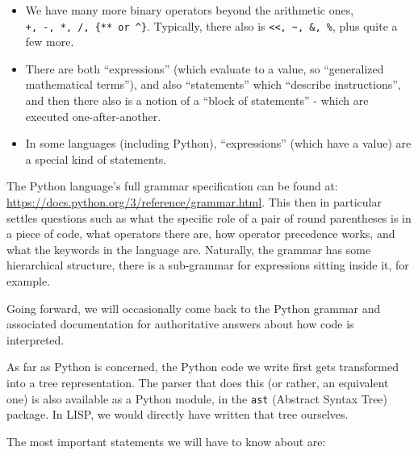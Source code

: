 \documentclass[11pt]{article}
\providecommand{\tightlist}{%
      \setlength{\itemsep}{0pt}\setlength{\parskip}{0pt}}
\begin{document}
\begin{itemize}
\tightlist
\item
  We have many more binary operators beyond the arithmetic ones,
  \texttt{+,\ -,\ *,\ /,\ \{**\ or\ \^{}\}}. Typically, there also is
  \texttt{\textless{}\textless{},\ \textasciitilde{},\ \&,\ \%}, plus
  quite a few more.
\item
  There are both ``expressions'' (which evaluate to a value, so
  ``generalized mathematical terms''), and also ``statements'' which
  ``describe instructions'', and then there also is a notion of a
  ``block of statements'' - which are executed one-after-another.
\item
  In some languages (including Python), ``expressions'' (which have a
  value) are a special kind of statements.
\end{itemize}

The Python language's full grammar specification can be found at:
\url{https://docs.python.org/3/reference/grammar.html}. This then in
particular settles questions such as what the specific role of a pair of
round parentheses is in a piece of code, what operators there are, how
operator precedence works, and what the keywords in the language are.
Naturally, the grammar has some hierarchical structure, there is a
sub-grammar for expressions sitting inside it, for example.

Going forward, we will occasionally come back to the Python grammar and
associated documentation for authoritative answers about how code is
interpreted.

As far as Python is concerned, the Python code we write first gets
transformed into a tree representation. The parser that does this (or
rather, an equivalent one) is also available as a Python module, in the
\texttt{ast} (Abstract Syntax Tree) package. In LISP, we would directly
have written that tree ourselves.

The most important statements we will have to know about are:
\end{document}

